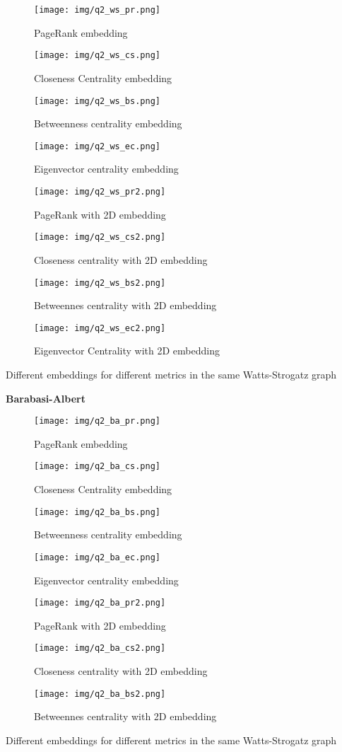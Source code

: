 \documentclass[a4paper]{article}
\begin{document}
\begin{figure}[H]
%
  \centering
    \texttt{[image: img/q2\_ws\_pr.png]}
    \caption{PageRank embedding}
\endminipage
{}%
  \centering
    \texttt{[image: img/q2\_ws\_cs.png]}
    \caption{Closeness Centrality embedding}
\endminipage
{}%
  \centering
    \texttt{[image: img/q2\_ws\_bs.png]}
    \caption{Betweenness centrality  embedding}
\endminipage
{}%
  \centering
    \texttt{[image: img/q2\_ws\_ec.png]}
    \caption{Eigenvector centrality embedding}
\endminipage\vfill

%
  \centering
    \texttt{[image: img/q2\_ws\_pr2.png]}
    \caption{PageRank with 2D embedding}
\endminipage
{}%
  \centering
    \texttt{[image: img/q2\_ws\_cs2.png]}
    \caption{Closeness centrality with 2D embedding}
\endminipage
{}%
  \centering
    \texttt{[image: img/q2\_ws\_bs2.png]}
    \caption{Betweennes centrality with 2D embedding}
\endminipage\hfill
{}%
  \centering
    \texttt{[image: img/q2\_ws\_ec2.png]}
    \caption{Eigenvector Centrality with 2D embedding}
\endminipage\vfill

\end{figure}\caption{Different embeddings for different metrics in the same Watts-Strogatz graph}




\textbf{Barabasi-Albert}

\begin{figure}[H]
%
  \centering
    \texttt{[image: img/q2\_ba\_pr.png]}
    \caption{PageRank embedding}
\endminipage
{}%
  \centering
    \texttt{[image: img/q2\_ba\_cs.png]}
    \caption{Closeness Centrality embedding}
\endminipage
{}%
  \centering
    \texttt{[image: img/q2\_ba\_bs.png]}
    \caption{Betweenness centrality  embedding}
\endminipage
{}%
  \centering
    \texttt{[image: img/q2\_ba\_ec.png]}
    \caption{Eigenvector centrality embedding}
\endminipage\vfill

%
  \centering
    \texttt{[image: img/q2\_ba\_pr2.png]}
    \caption{PageRank with 2D embedding}
\endminipage
{}%
  \centering
    \texttt{[image: img/q2\_ba\_cs2.png]}
    \caption{Closeness centrality with 2D embedding}
\endminipage
{}%
  \centering
    \texttt{[image: img/q2\_ba\_bs2.png]}
    \caption{Betweennes centrality with 2D embedding}
\endminipage\hfill

\end{figure}\caption{Different embeddings for different metrics in the same Watts-Strogatz graph}
\end{document}

